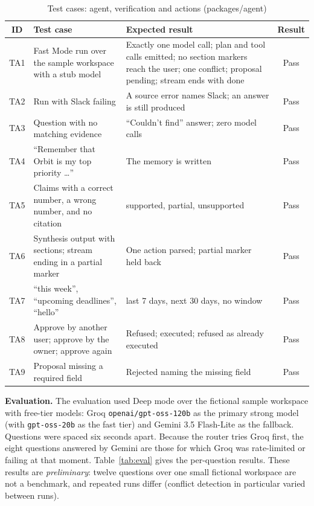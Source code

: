 \documentclass[oneside,a4paper,12pt]{report}
\begin{document}
\begin{table}[!htbp]
\begin{center}
\def\arraystretch{1.25}
\small
\begin{tabularx}{\textwidth}{| c | X | X | c |}
\hline
ID & Test case & Expected result & Result \\ \hline
TA1 & Fast Mode run over the sample workspace with a stub model & Exactly one model call; plan and tool calls emitted; no section markers reach the user; one conflict; proposal pending; stream ends with done & Pass \\ \hline
TA2 & Run with Slack failing & A source error names Slack; an answer is still produced & Pass \\ \hline
TA3 & Question with no matching evidence & ``Couldn't find'' answer; zero model calls & Pass \\ \hline
TA4 & ``Remember that Orbit is my top priority \ldots'' & The memory is written & Pass \\ \hline
TA5 & Claims with a correct number, a wrong number, and no citation & supported, partial, unsupported & Pass \\ \hline
TA6 & Synthesis output with sections; stream ending in a partial marker & One action parsed; partial marker held back & Pass \\ \hline
TA7 & ``this week'', ``upcoming deadlines'', ``hello'' & last 7 days, next 30 days, no window & Pass \\ \hline
TA8 & Approve by another user; approve by the owner; approve again & Refused; executed; refused as already executed & Pass \\ \hline
TA9 & Proposal missing a required field & Rejected naming the missing field & Pass \\ \hline
\end{tabularx}
\end{center}
\caption{Test cases: agent, verification and actions (packages/agent)}
\label{tab:test-agent}
\end{table}

\textbf{Evaluation.} The evaluation used Deep mode over the fictional sample workspace with free-tier models: Groq \texttt{openai/gpt-oss-120b} as the primary strong model (with \texttt{gpt-oss-20b} as the fast tier) and Gemini 3.5 Flash-Lite as the fallback. Questions were spaced six seconds apart. Because the router tries Groq first, the eight questions answered by Gemini are those for which Groq was rate-limited or failing at that moment. Table~\ref{tab:eval} gives the per-question results. These results are \emph{preliminary}: twelve questions over one small fictional workspace are not a benchmark, and repeated runs differ (conflict detection in particular varied between runs).
\end{document}
